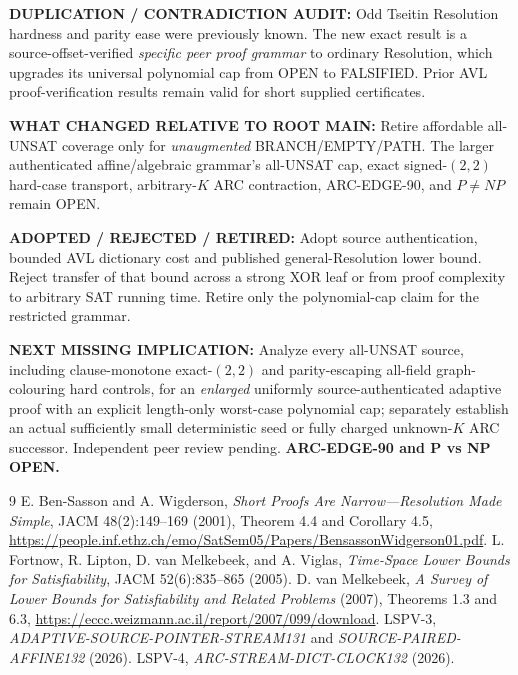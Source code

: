 \documentclass[11pt]{article}
\begin{document}
\noindent\textbf{DUPLICATION / CONTRADICTION AUDIT:} Odd Tseitin Resolution hardness and parity ease were previously known. The new exact result is a source-offset-verified \emph{specific peer proof grammar} to ordinary Resolution, which upgrades its universal polynomial cap from OPEN to FALSIFIED. Prior AVL proof-verification results remain valid for short supplied certificates.

\noindent\textbf{WHAT CHANGED RELATIVE TO ROOT MAIN:} Retire affordable all-UNSAT coverage only for \emph{unaugmented} BRANCH/EMPTY/PATH. The larger authenticated affine/algebraic grammar's all-UNSAT cap, exact signed-$(2,2)$ hard-case transport, arbitrary-$K$ ARC contraction, ARC-EDGE-90, and $P\ne NP$ remain OPEN.

\noindent\textbf{ADOPTED / REJECTED / RETIRED:} Adopt source authentication, bounded AVL dictionary cost and published general-Resolution lower bound. Reject transfer of that bound across a strong XOR leaf or from proof complexity to arbitrary SAT running time. Retire only the polynomial-cap claim for the restricted grammar.

\noindent\textbf{NEXT MISSING IMPLICATION:} Analyze every all-UNSAT source, including clause-monotone exact-$(2,2)$ and parity-escaping all-field graph-colouring hard controls, for an \emph{enlarged} uniformly source-authenticated adaptive proof with an explicit length-only worst-case polynomial cap; separately establish an actual sufficiently small deterministic seed or fully charged unknown-$K$ ARC successor. Independent peer review pending. \textbf{ARC-EDGE-90 and P vs NP OPEN.}

\begin{thebibliography}{9}
 E. Ben-Sasson and A. Wigderson, \emph{Short Proofs Are Narrow---Resolution Made Simple}, JACM 48(2):149--169 (2001), Theorem 4.4 and Corollary 4.5, \url{https://people.inf.ethz.ch/emo/SatSem05/Papers/BensassonWidgerson01.pdf}.
 L. Fortnow, R. Lipton, D. van Melkebeek, and A. Viglas, \emph{Time-Space Lower Bounds for Satisfiability}, JACM 52(6):835--865 (2005).
 D. van Melkebeek, \emph{A Survey of Lower Bounds for Satisfiability and Related Problems} (2007), Theorems 1.3 and 6.3, \url{https://eccc.weizmann.ac.il/report/2007/099/download}.
 LSPV-3, \emph{ADAPTIVE-SOURCE-POINTER-STREAM131} and \emph{SOURCE-PAIRED-AFFINE132} (2026).
 LSPV-4, \emph{ARC-STREAM-DICT-CLOCK132} (2026).
\end{thebibliography}
\end{document}
